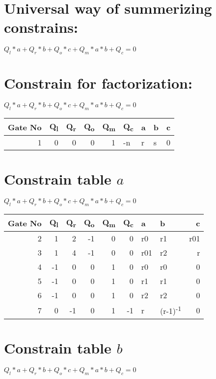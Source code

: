 \documentclass[11pt]{article}
\begin{document}
\section{Universal way of summerizing constrains:}
\label{sec:orgef1d037}
\(Q_l*a + Q_r*b + Q_o*c + Q_m*a*b + Q_c = 0\)

\section{Constrain for factorization:}
\label{sec:orgdababe0}
\(Q_l*a + Q_r*b + Q_o*c + Q_m*a*b + Q_c = 0\)

\begin{center}
\begin{tabular}{rrrrrlllr}
Gate No & Q\textsubscript{l} & Q\textsubscript{r} & Q\textsubscript{o} & Q\textsubscript{m} & Q\textsubscript{c} & a & b & c\\[0pt]
\hline
1 & 0 & 0 & 0 & 1 & -n & r & s & 0\\[0pt]
\end{tabular}
\end{center}

\section{Constrain table \(a\)}
\label{sec:orga0851f0}
\(Q_l*a + Q_r*b + Q_o*c + Q_m*a*b + Q_c = 0\)

\begin{center}
\begin{tabular}{rrrrrrllr}
Gate No & Q\textsubscript{l} & Q\textsubscript{r} & Q\textsubscript{o} & Q\textsubscript{m} & Q\textsubscript{c} & a & b & c\\[0pt]
\hline
2 & 1 & 2 & -1 & 0 & 0 & r0 & r1 & r01\\[0pt]
3 & 1 & 4 & -1 & 0 & 0 & r01 & r2 & r\\[0pt]
4 & -1 & 0 & 0 & 1 & 0 & r0 & r0 & 0\\[0pt]
5 & -1 & 0 & 0 & 1 & 0 & r1 & r1 & 0\\[0pt]
6 & -1 & 0 & 0 & 1 & 0 & r2 & r2 & 0\\[0pt]
7 & 0 & -1 & 0 & 1 & -1 & r & (r-1)\textsuperscript{-1} & 0\\[0pt]
\hline
\end{tabular}
\end{center}

\section{Constrain table  \(b\)}
\label{sec:orgbae5eb4}
\(Q_l*a + Q_r*b + Q_o*c + Q_m*a*b + Q_c = 0\)
\end{document}
